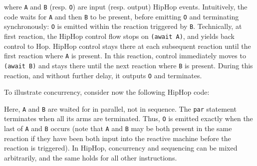 \documentclass{llncs}
\begin{document}
{\footnotesize{
}}
\noindent where {\texttt{A}} and {\texttt{B}} (resp. {\texttt{O}}) are input
(resp. output) HipHop events. Intuitively, the code waits for {\texttt{A}} and then {\texttt{B}}
to be present, before emitting {\texttt{O}}
and terminating synchronously: {\texttt{O}} is emitted within
the reaction triggered by {\texttt{B}}. Technically, at first reaction, the HipHop
control flow stops on {\texttt{(await{} A)}}, and yields back
control to Hop. HipHop control stays there at each subsequent reaction until
the first reaction where {\texttt{A}} is present. In this reaction,
control immediately moves to {\texttt{(await{} B)}} and stays
there until the next reaction where {\texttt{B}} is present. During
this reaction, and without further delay, it outputs {\texttt{O}} and
terminates.

To illustrate concurrency, consider now the following HipHop code:

{\footnotesize{
}}
\noindent Here, {\texttt{A}} and {\texttt{B}} are waited for in parallel, not in
sequence. The \texttt{par{}} statement
terminates when all its arms are terminated. Thus, {\texttt{O}} is
emitted exactly when the last of {\texttt{A}} and {\texttt{B}}
occurs (note that {\texttt{A}} and {\texttt{B}} may be both present
in the same reaction if they have been both input into the reactive machine
before the reaction is triggered). In HipHop, concurrency and
sequencing can be mixed arbitrarily, and the same holds for all other
instructions.
\end{document}
